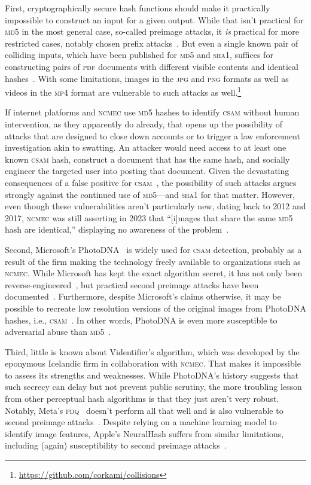 \documentclass[nonacm,screen]{acmart}
\newcommand\V[1]{\textsc{\MakeLowercase{#1}}}
\begin{document}
First, cryptographically secure hash functions should make it practically
impossible to construct an input for a given output. While that isn't practical
for \V{MD5} in the most general case, so-called preimage attacks, it \emph{is}
practical for more restricted cases, notably chosen prefix
attacks~\cite{StevensLenstraea2012}. But even a single known pair of colliding
inputs, which have been published for \V{MD5} and \V{SHA1}, suffices for
constructing pairs of \V{PDF} documents with different visible contents and
identical hashes~\cite{LeurentPeyrin2020,StevensBurszteinea2017}. With some
limitations, images in the \V{JPG} and \V{PNG} formats as well as videos in the
\V{MP4} format are vulnerable to such attacks as
well.\footnote{\url{https://github.com/corkami/collisions}}

If internet platforms and \V{NCMEC} use \V{MD5} hashes to identify \V{CSAM}
without human intervention, as they apparently do already, that opens up the
possibility of attacks that are designed to close down accounts or to trigger a
law enforcement investigation akin to swatting. An attacker would need access to
at least one known \V{CSAM} hash, construct a document that has the same hash,
and socially engineer the targeted user into posting that document. Given the
devastating consequences of a false positive for \V{CSAM}~\cite{Hill2022}, the
possibility of such attacks argues strongly against the continued use of
\V{MD5}---and \V{SHA1} for that matter. However, even though these
vulnerabilities aren't particularly new, dating back to 2012 and 2017, \V{NCMEC}
was still asserting in 2023 that ``[i]mages that share the same \V{MD5} hash are
identical,'' displaying no awareness of the problem~\cite{NCMEC2024}.

Second, Microsoft's PhotoDNA~\cite{Farid2018} is widely used for \V{CSAM}
detection, probably as a result of the firm making the technology freely
available to organizations such as \V{NCMEC}. While Microsoft has kept the exact
algorithm secret, it has not only been reverse-engineered~\cite{Krawetz2021a},
but practical second preimage attacks have been
documented~\cite{ProkosJoisea2021}. Furthermore, despite Microsoft's claims
otherwise, it may be possible to recreate low resolution versions of the
original images from PhotoDNA hashes, i.e., \V{CSAM}~\cite{Athalye2021}. In
other words, PhotoDNA is even more susceptible to adversarial abuse than
\V{MD5}~\cite{Steinebach2023}.

Third, little is known about Videntifier's algorithm, which was developed by the
eponymous Icelandic firm in collaboration with \V{NCMEC}. That makes it
impossible to assess its strengths and weaknesses. While PhotoDNA's history
suggests that such secrecy can delay but not prevent public scrutiny, the more
troubling lesson from other perceptual hash algorithms is that they just aren't
very robust. Notably, Meta's \V{PDQ}~\cite{DavisRosen2019} doesn't perform all
that well and is also vulnerable to second preimage
attacks~\cite{Krawetz2022,ProkosJoisea2021}. Despite relying on a machine
learning model to identify image features, Apple's NeuralHash suffers from
similar limitations, including (again) susceptibility to second preimage
attacks~\cite{StruppekHintersdorfea2022}.
\end{document}
